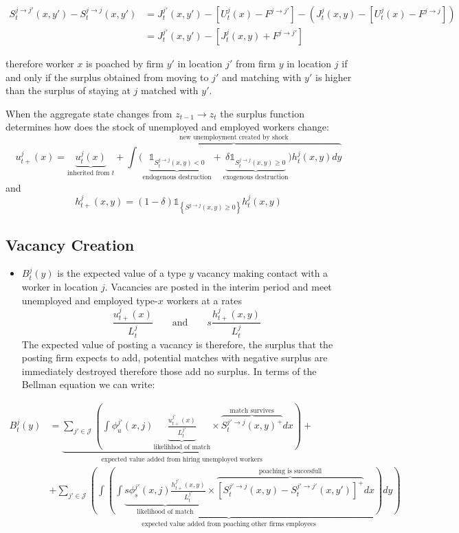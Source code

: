 \documentclass[
  letterpaper,
  DIV=11,
  numbers=noendperiod]{scrreprt}
\providecommand{\tightlist}{%
  \setlength{\itemsep}{0pt}\setlength{\parskip}{0pt}}\usepackage{longtable,booktabs,array}
\begin{document}
\begin{align*}
  S_t^{j\to j'}(x,y') - S^{j \to j}_t(x,y') &= J^{j'}_{t}(x,y') - [U^{j}_t(x) - F^{j\to j'}] - \left(J^{j}_{t}(x,y) - [U^{j}_t(x) - F^{j\to j}]\right) \\ 
  &=  J^{j'}_{t}(x,y') - [ J^{j}_{t}(x,y) + F^{j\to j'}]
\end{align*}

therefore worker \(x\) is poached by firm \(y'\) in location \(j'\) from
firm \(y\) in location \(j\) if and only if the surplus obtained from
moving to \(j'\) and matching with \(y'\) is higher than the surplus of
staying at \(j\) matched with \(y'\).

When the aggregate state changes from \(z_{t-1} \to z_t\) the surplus
function determines how does the stock of unemployed and employed
workers change:
\[u^{j}_{t+}(x) = \underbrace{u^j_t(x)}_{\text{inherited from }t} + \overbrace{\int \Big(\underbrace{\mathbb{1}_{S^{j \to j}_t(x,y)<0}}_{\text{endogenous destruction}} + \underbrace{\delta\mathbb{1}_{S^{j \to j}_t(x,y)\geq0}}_{\text{exogenous destruction}}\Big)h^j_t(x,y)dy}^{\text{new unemployment created by shock}}\]
and
\[h^{j}_{t+}(x,y) = (1-\delta)\mathbb{1}_{\left\{S^{j \to j}(x,y)\geq 0\right\}}h^j_t(x,y)\]

\hypertarget{vacancy-creation}{%
\subsection{Vacancy Creation}\label{vacancy-creation}}

\begin{itemize}
\tightlist
\item
  \(B^j_t(y)\) is the expected value of a type \(y\) vacancy making
  contact with a worker in location \(j\). Vacancies are posted in the
  interim period and meet unemployed and employed type-\(x\) workers at
  a rates
  \[\frac{u^j_{t+}(x)}{L^j_t} \qquad \text{and} \qquad s\frac{h^j_{t+}(x,y)}{L^j_t}\]
  The expected value of posting a vacancy is therefore, the surplus that
  the posting firm expects to add, potential matches with negative
  surplus are immediately destroyed therefore those add no surplus. In
  terms of the Bellman equation we can write:
\end{itemize}

\begin{align}
B^j_t(y) &= \underbrace{\sum_{j'\in \mathcal{J}}\left( \int\phi_u^{j'}(x,j)\underbrace{\frac{u^{j'}_{t+}(x)}{L^{j'}_t}}_{\text{likelihhod of match}}\times\overbrace{  S_t^{j'\to j}(x,y)^{+} }^{\text{match survives}}dx\right)}_{\text{expected value added from hiring unemployed workers}} + \nonumber \\
& +\underbrace{\sum_{j'\in \mathcal{J}}\left(\int \left(\int\underbrace{s\phi_s^{j'}(x,j)\frac{h^{j'}_{t+}(x,y)}{L^{j'}_t}}_{\text{likelihood of match}}\times \overbrace{ [S^{j' \to j}_t(x,y)-S^{j' \to j'}_{t}(x,y')]^{+}}^{\text{poaching is succesfull}}dx\right)dy\right)}_{\text{expected value added from poaching other firms employees}}
\end{align}
\end{document}
